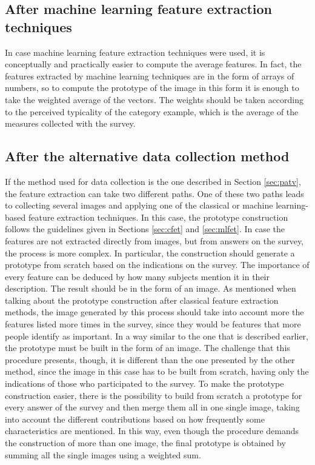 \documentclass[conference]{IEEEtran}
\begin{document}
		\subsection{After machine learning feature extraction techniques\label{sec:mlfet}}
		
			\noindent In case machine learning feature extraction techniques were used, it is conceptually and practically easier to compute the average features. In fact, the features extracted by machine learning techniques are 
			in the form of arrays of numbers, so to compute the prototype of the image in this form it is enough to take the weighted average of the vectors. The weights should be taken according to the perceived typicality 
			of the category example, which is the average of the measures collected with the survey.
			
		\subsection{After the alternative data collection method}
		
			\noindent If the method used for data collection is the one described in Section \ref{sec:patv}, the feature extraction can take two different paths. One of these two paths leads to collecting 
			several images and applying one of the classical or machine learning-based feature extraction techniques. In this case, the prototype construction follows the guidelines given in Sections \ref{sec:cfet} and \ref{sec:mlfet}.
			In case the features are not extracted directly from images, but from answers on the survey, the process is more complex. In particular, the construction should generate a prototype from 
			scratch based on the indications on the survey. The importance of every feature can be deduced by how many subjects mention it in their description. The result should be in the form of an image. 
			As mentioned when talking about the prototype construction after classical feature extraction methods, the image generated by this process should take into account more the features listed more 
			times in the survey, since they would be features that more people identify as important. In a way similar to the one that is described earlier, the prototype must be built in the form of an image. 
			The challenge that this procedure presents, though, it is different than the one presented by the other method, since the image in this case has to be built from scratch, having only the indications of 
			those who participated to the survey. To make the prototype construction easier, there is the possibility to build from scratch a prototype for every answer of the survey and then merge them all in one 
			single image, taking into account the different contributions based on how frequently some characteristics are mentioned. In this way, even though the procedure demands the construction of more than one 
			image, the final prototype is obtained by summing all the single images using a weighted sum.
		 
\end{document}
